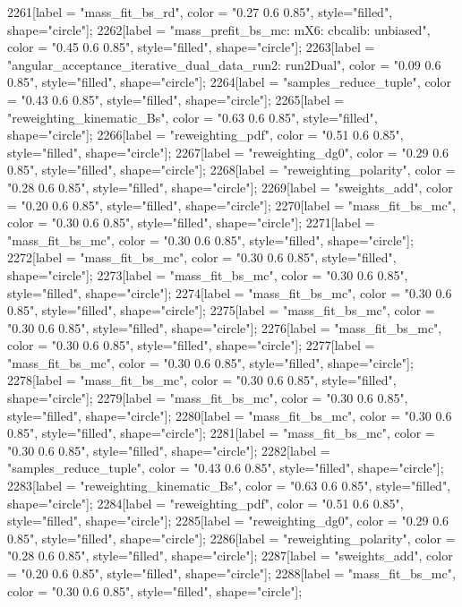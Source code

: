 {	2261[label = "mass_fit_bs_rd", color = "0.27 0.6 0.85", style="filled", shape="circle"];
	2262[label = "mass_prefit_bs_mc\nmassbin: mX6\nmassmodel: cbcalib\ntrigger: unbiased", color = "0.45 0.6 0.85", style="filled", shape="circle"];
	2263[label = "angular_acceptance_iterative_dual_data_run2\nangacc: run2Dual", color = "0.09 0.6 0.85", style="filled", shape="circle"];
	2264[label = "samples_reduce_tuple", color = "0.43 0.6 0.85", style="filled", shape="circle"];
	2265[label = "reweighting_kinematic_Bs", color = "0.63 0.6 0.85", style="filled", shape="circle"];
	2266[label = "reweighting_pdf", color = "0.51 0.6 0.85", style="filled", shape="circle"];
	2267[label = "reweighting_dg0", color = "0.29 0.6 0.85", style="filled", shape="circle"];
	2268[label = "reweighting_polarity", color = "0.28 0.6 0.85", style="filled", shape="circle"];
	2269[label = "sweights_add", color = "0.20 0.6 0.85", style="filled", shape="circle"];
	2270[label = "mass_fit_bs_mc", color = "0.30 0.6 0.85", style="filled", shape="circle"];
	2271[label = "mass_fit_bs_mc", color = "0.30 0.6 0.85", style="filled", shape="circle"];
	2272[label = "mass_fit_bs_mc", color = "0.30 0.6 0.85", style="filled", shape="circle"];
	2273[label = "mass_fit_bs_mc", color = "0.30 0.6 0.85", style="filled", shape="circle"];
	2274[label = "mass_fit_bs_mc", color = "0.30 0.6 0.85", style="filled", shape="circle"];
	2275[label = "mass_fit_bs_mc", color = "0.30 0.6 0.85", style="filled", shape="circle"];
	2276[label = "mass_fit_bs_mc", color = "0.30 0.6 0.85", style="filled", shape="circle"];
	2277[label = "mass_fit_bs_mc", color = "0.30 0.6 0.85", style="filled", shape="circle"];
	2278[label = "mass_fit_bs_mc", color = "0.30 0.6 0.85", style="filled", shape="circle"];
	2279[label = "mass_fit_bs_mc", color = "0.30 0.6 0.85", style="filled", shape="circle"];
	2280[label = "mass_fit_bs_mc", color = "0.30 0.6 0.85", style="filled", shape="circle"];
	2281[label = "mass_fit_bs_mc", color = "0.30 0.6 0.85", style="filled", shape="circle"];
	2282[label = "samples_reduce_tuple", color = "0.43 0.6 0.85", style="filled", shape="circle"];
	2283[label = "reweighting_kinematic_Bs", color = "0.63 0.6 0.85", style="filled", shape="circle"];
	2284[label = "reweighting_pdf", color = "0.51 0.6 0.85", style="filled", shape="circle"];
	2285[label = "reweighting_dg0", color = "0.29 0.6 0.85", style="filled", shape="circle"];
	2286[label = "reweighting_polarity", color = "0.28 0.6 0.85", style="filled", shape="circle"];
	2287[label = "sweights_add", color = "0.20 0.6 0.85", style="filled", shape="circle"];
	2288[label = "mass_fit_bs_mc", color = "0.30 0.6 0.85", style="filled", shape="circle"];
}
